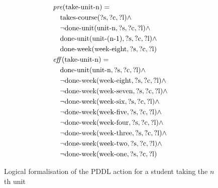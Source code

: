 \begin{figure}[t]
  \small  %
  \begin{align*}
  &\mathit{pre}(\text{take-unit-n}) = \\
  &\quad \text{takes-course}(\text{?s}, \text{?c}, \text{?l}) \land \\
  &\quad \lnot \text{done-unit}(\text{unit-n}, \text{?s}, \text{?c}, \text{?l}) \land \\
  &\quad \text{done-unit}(\text{unit-(n-1)}, \text{?s}, \text{?c}, \text{?l}) \land \\
  &\quad \text{done-week}(\text{week-eight}, \text{?s}, \text{?c}, \text{?l}) \\
  &\mathit{eff}(\text{take-unit-n}) = \\
  &\quad \text{done-unit}(\text{unit-n}, \text{?s}, \text{?c}, \text{?l}) \land \\
  &\quad \lnot \text{done-week}(\text{week-eight}, \text{?s}, \text{?c}, \text{?l}) \land \\
  &\quad \lnot \text{done-week}(\text{week-seven}, \text{?s}, \text{?c}, \text{?l}) \land \\
  &\quad \lnot \text{done-week}(\text{week-six}, \text{?s}, \text{?c}, \text{?l}) \land \\
  &\quad \lnot \text{done-week}(\text{week-five}, \text{?s}, \text{?c}, \text{?l}) \land \\
  &\quad \lnot \text{done-week}(\text{week-four}, \text{?s}, \text{?c}, \text{?l}) \land \\
  &\quad \lnot \text{done-week}(\text{week-three}, \text{?s}, \text{?c}, \text{?l}) \land \\
  &\quad \lnot \text{done-week}(\text{week-two}, \text{?s}, \text{?c}, \text{?l}) \land \\
  &\quad \lnot \text{done-week}(\text{week-one}, \text{?s}, \text{?c}, \text{?l})
  \end{align*}
  \caption{Logical formalisation of the PDDL action for a student taking the $n$th unit}\label{fig:take-unit-n}
\end{figure}